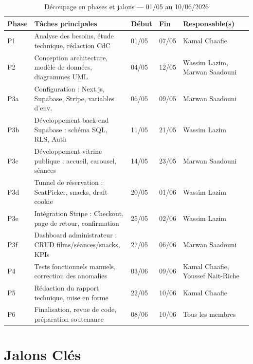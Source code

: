 \documentclass[12pt,a4paper,openany]{report}
\begin{document}
\begin{table}[H]
\centering
\small
\begin{tabular}{p{0.8cm}p{6.2cm}p{1.2cm}p{1.2cm}p{3.6cm}}
\toprule
\textbf{Phase} & \textbf{Tâches principales} & \textbf{Début} & \textbf{Fin} & \textbf{Responsable(s)} \\
\midrule
P1  & Analyse des besoins, étude technique, rédaction CdC & 01/05 & 07/05 & Kamal Chaafie \\
P2  & Conception architecture, modèle de données, diagrammes UML & 04/05 & 12/05 & Wassim Lazim, Marwan Saadouni \\
P3a & Configuration : Next.js, Supabase, Stripe, variables d'env. & 06/05 & 09/05 & Marwan Saadouni \\
P3b & Développement back-end Supabase : schéma SQL, RLS, Auth & 11/05 & 21/05 & Wassim Lazim \\
P3c & Développement vitrine publique : accueil, carousel, séances & 14/05 & 23/05 & Marwan Saadouni \\
P3d & Tunnel de réservation : SeatPicker, snacks, draft cookie & 20/05 & 01/06 & Wassim Lazim \\
P3e & Intégration Stripe : Checkout, page de retour, confirmation & 25/05 & 02/06 & Wassim Lazim \\
P3f & Dashboard administrateur : CRUD films/séances/snacks, KPIs & 27/05 & 06/06 & Marwan Saadouni \\
P4  & Tests fonctionnels manuels, correction des anomalies & 03/06 & 09/06 & Kamal Chaafie, Youssef Nait-Riche \\
P5  & Rédaction du rapport technique, mise en forme & 22/05 & 10/06 & Kamal Chaafie \\
P6  & Finalisation, revue de code, préparation soutenance & 08/06 & 10/06 & Tous les membres \\
\bottomrule
\end{tabular}
\caption{Découpage en phases et jalons — 01/05 au 10/06/2026}
\end{table}

\section{Jalons Clés}
\end{document}
